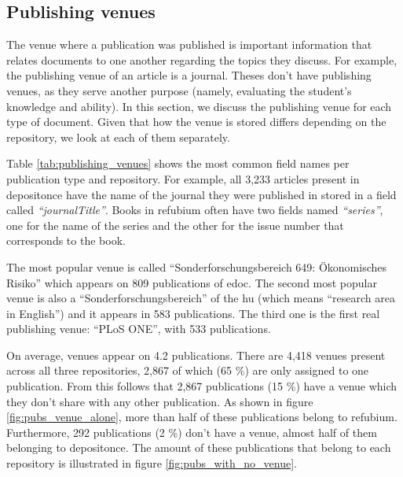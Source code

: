\subsection{Publishing venues} \label{repo_analysis_venues}

The venue where a publication was published is important information that relates documents to one another regarding the topics they discuss. For example, the publishing venue of an article is a journal. Theses don't have publishing venues, as they serve another purpose (namely, evaluating the student's knowledge and ability). In this section, we discuss the publishing venue for each type of document. Given that how the venue is stored differs depending on the repository, we look at each of them separately.

Table \ref{tab:publishing_venues} shows the most common field names per publication type and repository. For example, all 3,233 articles present in depositonce have the name of the journal they were published in stored in a field called \textit{``journalTitle''}. Books in refubium often have two fields named \textit{``series''}, one for the name of the series and the other for the issue number that corresponds to the book.

The most popular venue is called ``Sonderforschungsbereich 649: Ökonomisches Risiko'' which appears on 809 publications of edoc. The second most popular venue is also a ``Sonderforschungsbereich'' of the \acrshort{hu} (which means ``research area in English'') and it appears in 583 publications. The third one is the first real publishing venue: ``PLoS ONE'', with 533 publications.

On average, venues appear on 4.2 publications. There are 4,418 venues present across all three repositories, 2,867 of which (65 \%) are only assigned to one publication. From this follows that 2,867 publications (15 \%) have a venue which they don't share with any other publication. As shown in figure \ref{fig:pubs_venue_alone}, more than half of these publications belong to refubium. Furthermore, 292 publications (2 \%) don't have a venue, almost half of them belonging to depositonce. The amount of these publications that belong to each repository is illustrated in figure \ref{fig:pubs_with_no_venue}.

